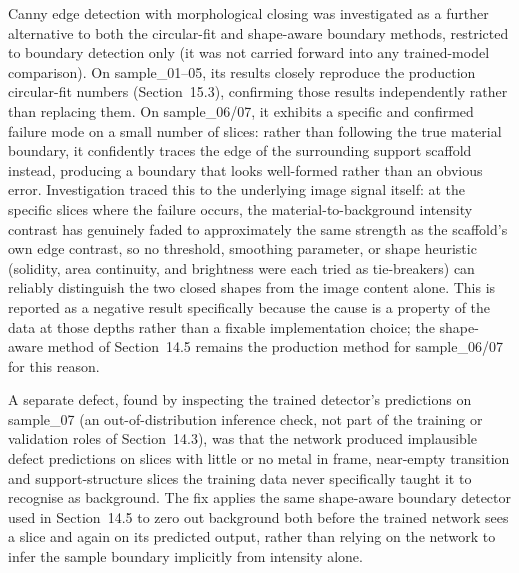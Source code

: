 Canny edge detection with morphological closing was investigated as a further alternative to both the
circular-fit and shape-aware boundary methods, restricted to boundary detection only (it was not
carried forward into any trained-model comparison). On sample\_01--05, its results closely reproduce
the production circular-fit numbers (Section~15.3), confirming those results independently rather than
replacing them. On sample\_06/07, it exhibits a specific and confirmed failure mode on a small number
of slices: rather than following the true material boundary, it confidently traces the edge of the
surrounding support scaffold instead, producing a boundary that looks well-formed rather than an
obvious error. Investigation traced this to the underlying image signal itself: at the specific slices
where the failure occurs, the material-to-background intensity contrast has genuinely faded to
approximately the same strength as the scaffold's own edge contrast, so no threshold, smoothing
parameter, or shape heuristic (solidity, area continuity, and brightness were each tried as
tie-breakers) can reliably distinguish the two closed shapes from the image content alone. This is
reported as a negative result specifically because the cause is a property of the data at those depths
rather than a fixable implementation choice; the shape-aware method of Section~14.5 remains the
production method for sample\_06/07 for this reason.

A separate defect, found by inspecting the trained detector's predictions on sample\_07 (an
out-of-distribution inference check, not part of the training or validation roles of
Section~14.3), was that the network produced implausible defect predictions on slices with little or
no metal in frame, near-empty transition and support-structure slices the training data never
specifically taught it to recognise as background. The fix applies the same shape-aware boundary
detector used in Section~14.5 to zero out background both before the trained network sees a slice and
again on its predicted output, rather than relying on the network to infer the sample boundary
implicitly from intensity alone.

